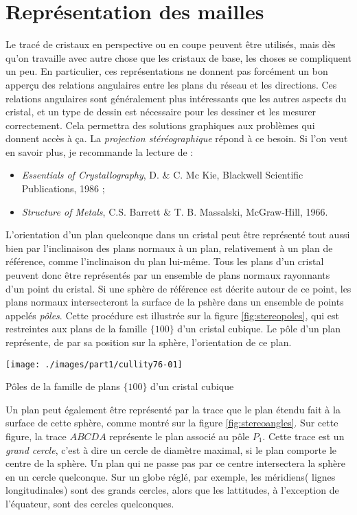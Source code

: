 \chapter{Représentation des mailles}

Le tracé de cristaux en perspective ou en coupe peuvent être utilisés, mais dès qu'on travaille avec autre chose que les cristaux de base, les choses se compliquent un peu. En particulier, ces représentations ne donnent pas forcément un bon apperçu des relations angulaires entre les plans du réseau et les directions. Ces relations angulaires sont généralement plus intéressants que les autres aspects du cristal, et un type de dessin est nécessaire pour les dessiner et les mesurer correctement. Cela permettra des solutions graphiques aux problèmes qui donnent accès à ça.
La \emph{projection stéréographique} répond à ce besoin.
Si l'on veut en savoir plus, je recommande la lecture de :
\begin{itemize}
    \item \emph{Essentials of Crystallography}, D. \& C. Mc Kie, Blackwell Scientific Publications, 1986 ;
    \item \emph{Structure of Metals}, C.S. Barrett \& T. B. Massalski, McGraw-Hill, 1966.
\end{itemize}

L'orientation d'un plan quelconque dans un cristal peut être représenté tout aussi bien par l'inclinaison des plans normaux à un plan, relativement à un plan de référence, comme l'inclinaison du plan lui-même. Tous les plans d'un cristal peuvent donc être représentés par un ensemble de plans normaux rayonnants d'un point du cristal. Si une sphère de référence est décrite autour de ce point, les plans normaux intersecteront la surface de la pshère dans un ensemble de points appelés \emph{pôles}. Cette procédure est illustrée sur la figure \ref{fig:stereopoles}, qui est restreintes aux plans de la famille $\{100\}$ d'un cristal cubique. Le pôle d'un plan représente, de par sa position sur la sphère, l'orientation de ce plan.

\begin{marginfigure}
    \texttt{[image: ./images/part1/cullity76-01]}
    \caption{Pôles de la famille de plans $\{100\}$ d'un cristal cubique}
    \label{fig:stereopoles}
\end{marginfigure}

Un plan peut également être représenté par la trace que le plan étendu fait à la surface de cette sphère, comme montré sur la figure \ref{fig:stereoangles}. Sur cette figure, la trace $ABCDA$ représente le plan associé au pôle $P_1$. Cette trace est un \emph{grand cercle}, c'est à dire un cercle de diamètre maximal, si le plan comporte le centre de la sphère. Un plan qui ne passe pas par ce centre intersectera la sphère en un cercle quelconque. Sur un globe réglé, par exemple, les méridiens( lignes longitudinales) sont des grands cercles, alors que les lattitudes, à l'exception de l'équateur, sont des cercles quelconques.

